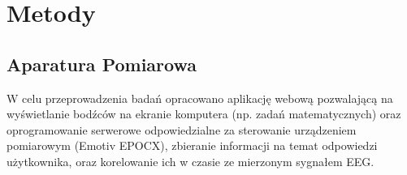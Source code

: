\documentclass{./assets/wfis}
\begin{document}
\chapter{Metody}

\section{Aparatura Pomiarowa}\label{aparatura-pomiarowa}
W celu przeprowadzenia badań opracowano aplikację webową pozwalającą na wyświetlanie bodźców na ekranie komputera (np. zadań matematycznych) oraz oprogramowanie serwerowe odpowiedzialne za sterowanie urządzeniem pomiarowym (Emotiv EPOCX), zbieranie informacji na temat odpowiedzi użytkownika, oraz korelowanie ich w czasie ze mierzonym sygnałem EEG.
\end{document}
